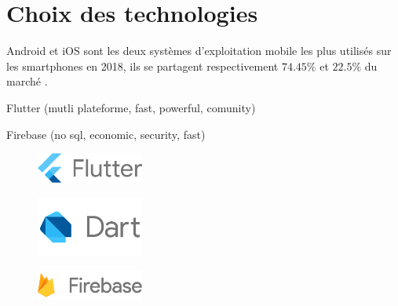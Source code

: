 \section{Choix des technologies}

Android et iOS sont les deux systèmes d'exploitation mobile les plus utilisés sur les smartphones en 2018, ils se partagent respectivement $74.45\%$ et $22.5\%$ du marché \cite{market_share}. 

%

Flutter (mutli plateforme, fast, powerful, comunity)

Firebase (no sql, economic, security, fast)


\begin{figure}[H]
  \includegraphics[width=100pt]{content/imgs/flutter.png}
\end{figure}

\begin{figure}[H]
  \includegraphics[width=100pt]{content/imgs/dart.png}
\end{figure}

\begin{figure}[H]
  \includegraphics[width=100pt]{content/imgs/firebase.png}
\end{figure}
